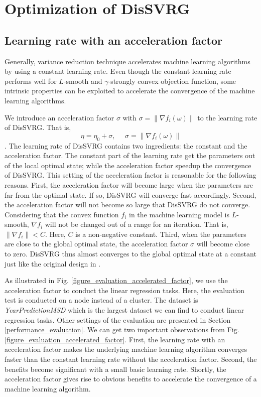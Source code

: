 \documentclass[preprint,review,11pt,a4paper]{elsarticle}
\begin{document}
\section{Optimization of DisSVRG}
\label{optimization_sgd}
\subsection{Learning rate with an acceleration factor}
Generally, variance reduction technique accelerates machine learning algorithms by using a constant learning rate. Even though the constant learning rate performs well for $L$-smooth and $\gamma$-strongly convex objection function, some intrinsic properties can be exploited to accelerate the convergence of the machine learning algorithms.

We introduce an acceleration factor $\sigma$ with $\sigma=\parallel \nabla f_i(\omega)\parallel$ to the learning rate of DisSVRG. That is,
\begin{equation}
\eta=\eta_0+\sigma,~~~~~~\sigma=\parallel \nabla f_i(\omega)\parallel
\end{equation}.
The learning rate of DisSVRG contains two ingredients: the constant and the acceleration factor. The constant part of the learning rate get the parameters out of the local optimal state; while the acceleration factor speedup the convergence of DisSVRG. This setting of the acceleration factor is reasonable for the following reasons. First, the acceleration factor will become large when the parameters are far from the optimal state. If so, DisSVRG will converge fast accordingly. Second, the acceleration factor will not become so large that DisSVRG do not converge. Considering that the convex function $f_i$ in the machine learning model is $L$-smooth, $\nabla f_i$ will not be changed out of  a range for an iteration. That is, $\parallel\nabla f_i\parallel<C$. Here, $C$ is a non-negative constant. Third, when the parameters are close to the global optimal state, the acceleration factor $\sigma$ will become close to zero. DisSVRG thus almost converges to the global optimal state at a constant just like the original design in \cite{Johnson:9MAvkbgy}.

As illustrated in Fig. \ref{figure_evaluation_accelerated_factor}, we use the acceleration factor to conduct the linear regression tasks. Here, the evaluation test is conducted on a node instead of a cluster. The dataset is \emph{YearPredictionMSD} which is the largest dataset we can find to conduct linear regression tasks. Other settings of the evaluation are presented in Section \ref{performance_evaluation}.  We can get two important observations from Fig. \ref{figure_evaluation_accelerated_factor}. First, the learning rate with an acceleration factor makes the underlying machine learning algorithm converges faster than the constant learning rate without the acceleration factor. Second, the benefits become significant with a small basic learning rate. Shortly, the acceleration factor gives rise to obvious benefits to accelerate the convergence of a machine learning algorithm.
\end{document}
